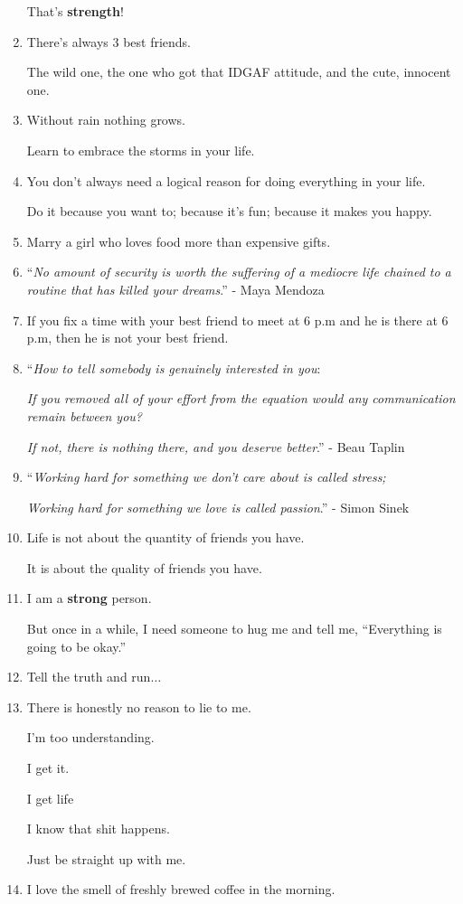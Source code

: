 \documentclass{article}
\begin{document}
\begin{enumerate}
	That's \textbf{strength}!
	\item There's always 3 best friends.
	
	The wild one, the one who got that IDGAF attitude, and the cute, innocent one.
	\item Without rain nothing grows.
	
	Learn to embrace the storms in your life.
	\item You don't always need a logical reason for doing everything in your life.
	
	Do it because you want to; because it's fun; because it makes you happy.
	\item Marry a girl who loves food more than expensive gifts.
	\item ``\textit{No amount of security is worth the suffering of a mediocre life chained to a routine that has killed your dreams}.'' - Maya Mendoza
	\item If you fix a time with your best friend to meet at 6 p.m and he is there at 6 p.m, then he is not your best friend.
	\item ``\textit{How to tell somebody is genuinely interested in you}:
	
	\textit{If you removed all of your effort from the equation would any communication remain between you?}
	
	\textit{If not, there is nothing there, and you deserve better}.'' - Beau Taplin
	\item ``\textit{Working hard for something we don't care about is called stress;}
	
	\textit{Working hard for something we love is called passion}.'' - Simon Sinek
	\item Life is not about the quantity of friends you have.
	
	It is about the quality of friends you have.
	\item I am a \textbf{strong} person.
	
	But once in a while, I need someone to hug me and tell me, ``Everything is going to be okay.''
	\item Tell the truth and run$\ldots$
	\item There is honestly no reason to lie to me.
	
	I'm too understanding.
	
	I get it.
	
	I get life
	
	I know that shit happens.
	
	Just be straight up with me.
	\item I love the smell of freshly brewed coffee in the morning.
	

\end{enumerate}
\end{document}
